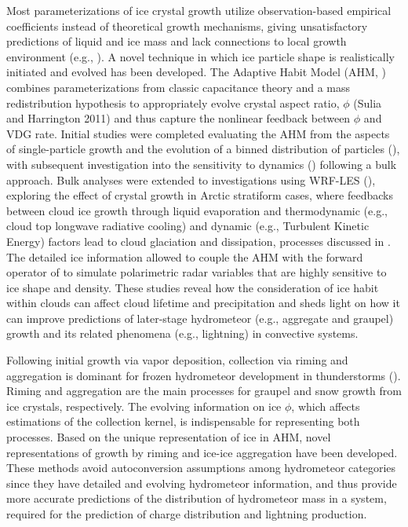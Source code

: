 Most parameterizations of ice crystal growth utilize observation-based empirical coefficients instead of theoretical growth mechanisms, giving unsatisfactory predictions of liquid and ice mass and lack connections to local growth environment (e.g., \cite{harrington1995parameterization, walko1995new, mitchell1996use, meyers1997new, woods2007improve, thompson2008explicit, morrison2008novel, morrison2010improved}). A novel technique in which ice particle shape is realistically initiated and evolved has been developed. The Adaptive Habit Model (AHM, \cite{harrington2013methoda}) combines parameterizations from classic capacitance theory and a mass redistribution hypothesis to appropriately evolve crystal aspect ratio, $\phi$ (Sulia and Harrington 2011) and thus capture the nonlinear feedback between $\phi$ and VDG rate.  Initial studies were completed evaluating the AHM from the aspects of single-particle growth and the evolution of a binned distribution of particles (\cite{sulia2011ice}), with subsequent investigation into the sensitivity to dynamics (\cite{sulia2013method}) following a bulk approach. Bulk analyses were extended to investigations using WRF-LES (\cite{sulia2014dynamical}), exploring the effect of crystal growth in Arctic stratiform cases, where feedbacks between cloud ice growth through liquid evaporation and thermodynamic (e.g., cloud top longwave radiative cooling) and dynamic (e.g., Turbulent Kinetic Energy) factors lead to cloud glaciation and dissipation, processes discussed in \cite{schubert1976experiments, harrington1995parameterization, ovchinnikov2011effects, morrison2012resilience}. The detailed ice information allowed \cite{ sulia2017simulateda,sulia2017simulatedb} to couple the AHM with the forward operator of \cite{ryzhkov2011polarimetric} to simulate polarimetric radar variables that are highly sensitive to ice shape and density. These studies reveal how the consideration of ice habit within clouds can affect cloud lifetime and precipitation and sheds light on how it can improve predictions of later-stage hydrometeor (e.g., aggregate and graupel) growth and its related phenomena (e.g., lightning) in convective systems.\par

Following initial growth via vapor deposition, collection via riming and aggregation is dominant for frozen hydrometeor development in thunderstorms (\cite{zeng2001microphysics}). Riming and aggregation are the main processes for graupel and snow growth from ice crystals, respectively. The evolving information on ice $\phi$, which affects estimations of the collection kernel, is indispensable for representing both processes. Based on the unique representation of ice in AHM, novel representations of growth by riming \cite{jensen2015modeling} and ice-ice aggregation \cite{sulia2021new} have been developed. These methods avoid autoconversion assumptions among hydrometeor categories since they have detailed and evolving hydrometeor information, and thus provide more accurate predictions of the distribution of hydrometeor mass in a system, required for the prediction of charge distribution and lightning production.
